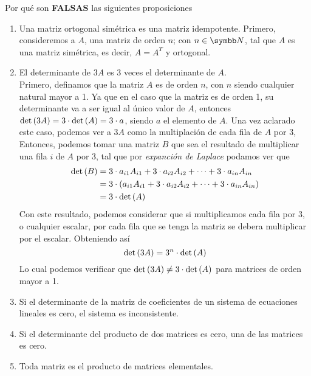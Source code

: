 \item Por qué son \textbf{FALSAS} las siguientes proposiciones
    \begin{enumerate}[label=\listAlph]
        \item Una matriz ortogonal simétrica es una matriz idempotente.
            Primero, consideremos a \(A\), una matriz de orden \(n\); con \(n \in \realN\), 
            tal que \(A\) es una matriz simétrica, es decir, \(A = A^T\) y ortogonal.
        \item El determinante de \(3A\) es 3 veces el determinante de \(A\). \\
            Primero, definamos que la matriz \(A\) es de orden \(n\), con \(n\) siendo cualquier natural mayor a 1.
            Ya que en el caso que la matriz es de orden 1, su determinante va a ser igual al único valor de \(A\), 
            entonces \(\text{det} \left( 3A \right) = 3 \cdot \text{det} \left( A \right) = 3 \cdot a\), siendo \(a\) el elemento de \(A\).
            Una vez aclarado este caso, podemos ver a \(3A\) como la multiplación de cada fila de \(A\) por 3, 
            Entonces, podemos tomar una matriz \(B\) que sea el resultado de multiplicar una fila \(i\) de \(A\) por 3,
            tal que por \emph{expanción de Laplace} podamos ver que
            \[
                \begin{aligned}
                    \text{det} \left( B \right) &= 3 \cdot a_{i1}A_{i1} + 3 \cdot a_{i2}A_{i2} + \cdots + 3 \cdot a_{in}A_{in} \\
                    &= 3 \cdot \left(a_{i1}A_{i1} + 3 \cdot a_{i2}A_{i2} + \cdots + 3 \cdot a_{in}A_{in}\right) \\
                    &= 3 \cdot \text{det} \left( A \right)
                \end{aligned}
            \]
            Con este resultado, podemos considerar que si multiplicamos cada fila por 3, o cualquier escalar, por cada fila que se tenga 
            la matriz se debera multiplicar por el escalar. Obteniendo así
            \[
                \text{det} \left( 3A \right) = 3^n \cdot \text{det} \left( A \right)
            \]
            Lo cual podemos verificar que \(\text{det} \left( 3A \right) \neq 3 \cdot \text{det} \left( A \right)\) para matrices de orden mayor a 1.
        \item Si el determinante de la matriz de coeficientes de un sistema de ecuaciones lineales es cero, el sistema es inconsistente.
        \item Si el determinante del producto de dos matrices es cero, una de las matrices es cero.
        \item Toda matriz es el producto de matrices elementales.

\end{enumerate}
